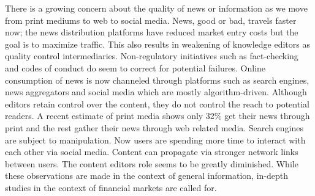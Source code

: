 There is a growing concern about the quality of news or information as we move from print mediums to web to social media. News, good or bad, travels faster now; the news distribution platforms have reduced market entry costs but the goal is to maximize traffic. This also results in weakening of knowledge editors as quality control intermediaries. Non-regulatory initiatives such as fact-checking and codes of conduct do seem to correct for potential failures. Online consumption of news is now channeled through platforms such as search engines, news aggregators and social media which are mostly algorithm-driven. Although editors retain control over the content, they do not control the reach to potential readers. A recent estimate of print media shows only 32\% get their news through print and the rest gather their news through web related media. Search engines are subject to manipulation. Now users are spending more time to interact with each other via social media. Content can propagate via stronger network links between users. The content editors role seems to be greatly diminished. While these observations are made in the context of general information, in-depth studies in the context of financial markets are called for. 